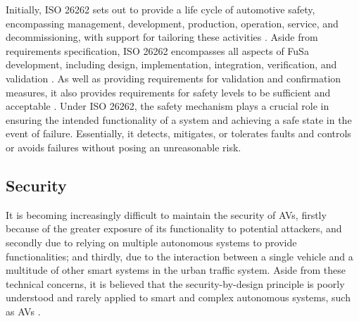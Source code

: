 \documentclass[a4paper,12pt]{article}
\begin{document}
\hspace{5mm} Initially, ISO 26262 sets out to provide a life cycle of automotive safety, encompassing management, development, production, operation, service, and decommissioning, with support for tailoring these activities \cite{article19}. Aside from requirements specification, ISO 26262 encompasses all aspects of FuSa development, including design, implementation, integration, verification, and validation \cite{article19}. As well as providing requirements for validation and confirmation measures, it also provides requirements for safety levels to be sufficient and acceptable \cite{article19}. Under ISO 26262, the safety mechanism plays a crucial role in ensuring the intended functionality of a system and achieving a safe state in the event of failure. Essentially, it detects, mitigates, or tolerates faults and controls or avoids failures without posing an unreasonable risk.



\subsection{Security}
\hspace{5mm} It is becoming increasingly difficult to maintain the security of AVs, firstly because of the greater exposure of its functionality to potential attackers, and secondly due to relying on multiple autonomous systems to provide functionalities; and thirdly, due to the interaction between a single vehicle and a multitude of other smart systems in the urban traffic system. Aside from these technical concerns, it is believed that the security-by-design principle is poorly understood and rarely applied to smart and complex autonomous systems, such as AVs \cite{s7}.
\end{document}
